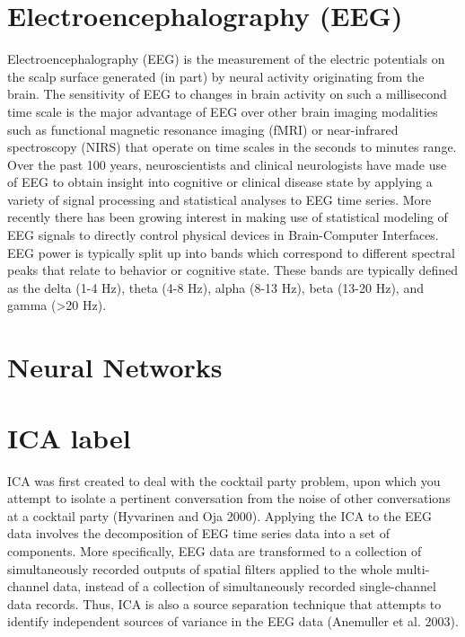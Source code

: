 \documentclass[12pt,a4paper,titlepage,openany]{report}
\begin{document}
\section{Electroencephalography (EEG)}

Electroencephalography (EEG) is the measurement of the electric potentials on the scalp surface generated (in part) by neural activity originating from the brain. 
The sensitivity of EEG to changes in brain activity on such a millisecond time scale is the major advantage of EEG over other brain imaging modalities such as functional magnetic resonance imaging (fMRI) or near-infrared spectroscopy (NIRS) that operate on time scales in the seconds to minutes range. 
Over the past 100 years, neuroscientists and clinical neurologists have made use of EEG to obtain insight into cognitive or clinical disease state by applying a variety of signal processing and statistical analyses to EEG time series. 
More recently there has been growing interest in making use of statistical modeling of EEG signals to directly control physical devices in Brain-Computer Interfaces.
EEG power is typically split up into bands which correspond to different spectral peaks that relate to behavior or cognitive state. These bands are typically defined as the delta (1-4 Hz), theta (4-8 Hz), alpha (8-13 Hz), beta (13-20 Hz), and gamma (\textgreater 20 Hz).\cite{nunez2016}

\section{Neural Networks}

\section{ICA label}

ICA was first created to deal with the cocktail party problem, upon which you attempt to isolate a pertinent conversation from the noise of other conversations at a cocktail party (Hyvarinen and Oja 2000). 
Applying the ICA to the EEG data involves the decomposition of EEG time series data into a set of components. 
More specifically, EEG data are transformed to a collection of simultaneously recorded outputs of spatial filters applied to the whole multi-channel data, instead of a collection of simultaneously recorded single-channel data records. 
Thus, ICA is also a source separation technique that attempts to identify independent sources of variance in the EEG data (Anemuller et  al. 2003).
\end{document}
